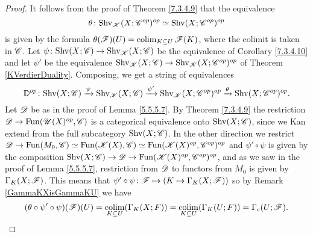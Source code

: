 \documentclass[../../thesis.tex]{subfiles}
\begin{document}
\begin{proof}
    It follows from the proof of Theorem \ref{7.3.4.9} that the equivalence
    \[
        \theta\colon \mathrm{Shv}_{\mathscr{K}}(X;\mathscr{C}^{op})^{op} \simeq \mathrm{Shv}(X;\mathscr{C}^{op})^{op}
    \]
    is given by the formula $\theta(\mathscr{F})(U) = \operatorname*{colim}_{K\subseteq U}\mathscr{F}(K)$, where the colimit is taken in $\mathscr{C}$.
    Let $\psi\colon \mathrm{Shv}(X;\mathscr{C}) \to \mathrm{Shv}_{\mathscr{K}}(X;\mathscr{C})$ be the equivalence of Corollary \ref{7.3.4.10} and let $\psi'$ be the equivalence $\mathrm{Shv}_{\mathscr{K}}(X;\mathscr{C}) \to \mathrm{Shv}_{\mathscr{K}}(X;\mathscr{C}^{op})^{op}$ of Theorem \ref{KVerdierDuality}.
    Composing, we get a string of equivalences
    \[
        \mathbb{D}^{op} \colon \mathrm{Shv}(X;\mathscr{C}) \xrightarrow{\psi} \mathrm{Shv}_{\mathscr{K}}(X;\mathscr{C}) \xrightarrow{\psi'} \mathrm{Shv}_{\mathscr{K}}(X;\mathscr{C}^{op})^{op} \xrightarrow{\theta} \mathrm{Shv}(X;\mathscr{C}^{op})^{op}.
    \]
    Let $\mathscr{D}$ be as in the proof of Lemma \ref{5.5.5.7}.
    By Theorem \ref{7.3.4.9} the restriction $\mathscr{D}\to \mathrm{Fun}(\mathscr{U}(X)^{op}, \mathscr{C})$ is a categorical equivalence onto $\mathrm{Shv}(X;\mathscr{C})$, since we Kan extend from the full subcategory $\mathrm{Shv}(X;\mathscr{C})$.
    \newline
    In the other direction we restrict $\mathscr{D} \to \mathrm{Fun}(M_0, \mathscr{C}) \simeq \mathrm{Fun}(\mathscr{K}(X), \mathscr{C}) \simeq \mathrm{Fun}(\mathscr{K}(X)^{op}, \mathscr{C}^{op})^{op}$ and $\psi' \circ \psi$ is given by the composition $\mathrm{Shv}(X;\mathscr{C}) \to \mathscr{D} \to \mathrm{Fun}(\mathscr{K}(X)^{op}, \mathscr{C}^{op})^{op}$, and as we saw in the proof of Lemma \ref{5.5.5.7}, restriction from $\mathscr{D}$ to functors from $M_0$ is given by $\Gamma_K(X;\mathscr{F})$.
    This means that $\psi' \circ \psi \colon \mathscr{F} \mapsto \left( K \mapsto \Gamma_K(X;\mathscr{F}) \right)$ so by Remark \ref{GammaKXisGammaKU} we have
    \[
        (\theta \circ \psi' \circ \psi)(\mathscr{F})(U) = \operatorname*{colim}_{K\subseteq U}(\Gamma_K(X;F)) = \operatorname*{colim}_{K\subseteq U}(\Gamma_K(U;F)) = \Gamma_c(U;\mathscr{F}).\qedhere
    \]
\end{proof}
\end{document}
